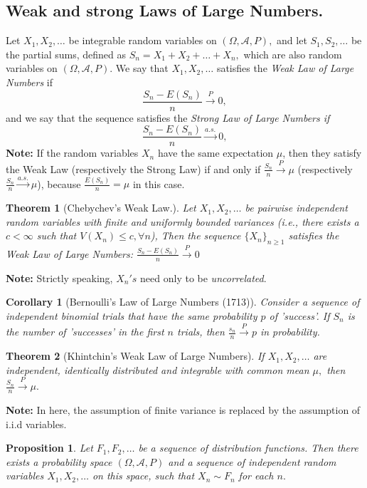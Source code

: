 \documentclass[12pt]{report} \addtolength{\textheight}{2in}
\newtheorem{cor}{Corollary}
\newtheorem{prop}{Proposition}
\newtheorem{thm}{Theorem}
\newcommand{\bigA}{\mathcal{A}}
\newcommand{\probsp}{(\Omega, \bigA, P)}
\newcommand{\asto}{\overset{a.s.}{\longrightarrow}}
\newcommand{\pto}{\overset{P}{\longrightarrow}}
\begin{document}
\subsection*{Weak and strong Laws of Large Numbers.}
Let $X_1,X_2,\dots$ be integrable random variables on $\probsp,$ and let $S_1,S_2,\dots$ be the partial sums, defined as $S_n=X_1+X_2+\dots+X_n,$ which are also random variables on $\probsp.$ We say that $X_1, X_2,\dots$ satisfies the \textit{Weak Law of Large Numbers} if 
\begin{displaymath}
\frac{S_n-E(S_n)}{n} \pto 0,
\end{displaymath}
and we say that the sequence satisfies the \textit{Strong Law of Large Numbers if}
\begin{displaymath}
\frac{S_n-E(S_n)}{n} \asto 0,
\end{displaymath}
\textbf{Note:} If the random variables $X_n$ have the same expectation $\mu$, then they satisfy the Weak Law (respectively the Strong Law) if and only if $\frac{S_n}{n}\pto \mu$ (respectively $\frac{S_n}{n}\asto \mu$), because $\frac{E(S_n)}{n}=\mu$ in this case.
\begin{thm}[Chebychev's Weak Law.]
Let $X_1,X_2,\dots$ be pairwise independent random variables with finite and uniformly bounded variances (i.e., there exists a $c <\infty$ such that $V(X_n) \leq c, \forall n$), Then the sequence $\{X_n\}_{n \geq 1}$ satisfies the Weak Law of Large Numbers: $\frac{S_n-E(S_n)}{n} \pto 0$
\end{thm}
\textbf{Note:} Strictly speaking, $X_n's$ need only to be \textit{uncorrelated}.
\begin{cor}[Bernoulli's Law of Large Numbers (1713)] Consider a sequence of independent binomial trials that have the same probability $p$ of 'success'.  If $S_n$ is the number of 'successes' in the first $n$ trials, then $\frac{s_n}{n} \pto p$ in probability.
\end{cor}
\begin{thm}[Khintchin's Weak Law of Large Numbers] If $X_1,X_2,\dots$ are independent, identically distributed and integrable with common mean $\mu,$ then $\frac{S_n}{n} \pto \mu.$
\end{thm}
\textbf{Note:} In here, the assumption of finite variance is replaced by the assumption of i.i.d variables.
\begin{prop}
Let $F_1,F_2,\dots$ be a sequence of distribution functions. Then there exists a probability space $\probsp$ and a sequence of independent random variables $X_1,X_2,\dots$ on this space, such that $X_n \sim F_n$ for each $n.$
\end{prop}
\end{document}
